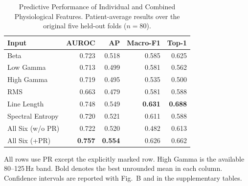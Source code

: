 \documentclass{article}
\begin{document}
\begin{table}[t]
\centering
\caption{Predictive Performance of Individual and Combined Physiological Features. Patient-average results over the original five held-out folds ($n=80$).}
\label{tab:physiological-prediction}
\scriptsize
\setlength{\tabcolsep}{2pt}
\begin{tabular*}{\columnwidth}{@{\extracolsep{\fill}}lrrrr@{}}
\toprule
Input & AUROC & AP & Macro-F1 & Top-1 \\
\midrule
Beta & 0.723 & 0.518 & 0.585 & 0.625 \\
Low Gamma & 0.713 & 0.499 & 0.581 & 0.562 \\
High Gamma & 0.719 & 0.495 & 0.535 & 0.500 \\
RMS & 0.663 & 0.479 & 0.581 & 0.588 \\
Line Length & 0.748 & 0.549 & \textbf{0.631} & \textbf{0.688} \\
Spectral Entropy & 0.720 & 0.521 & 0.611 & 0.588 \\
All Six (w/o PR) & 0.722 & 0.520 & 0.482 & 0.613 \\
All Six (+PR) & \textbf{0.757} & \textbf{0.554} & 0.626 & 0.662 \\
\bottomrule
\end{tabular*}
\par\vspace{2pt}
\parbox{\columnwidth}{\scriptsize All rows use PR except the explicitly marked row. High Gamma is the available 80--125\,Hz band. Bold denotes the best unrounded mean in each column. Confidence intervals are reported with Fig.~B and in the supplementary tables.}
\end{table}
\end{document}
